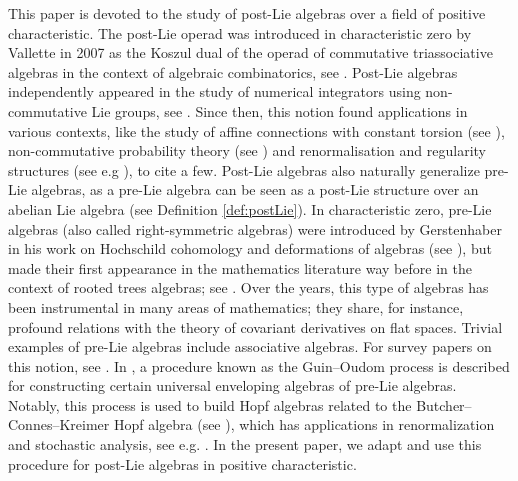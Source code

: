\documentclass[12pt]{article}
\begin{document}
This paper is devoted to the study of post-Lie algebras over a field of positive characteristic. The post-Lie operad was introduced in characteristic zero by Vallette in 2007 as the Koszul dual of the operad of commutative triassociative algebras in the context of algebraic combinatorics, see \cite{Va}. Post-Lie algebras independently appeared in the study of numerical integrators using non-commutative Lie groups, see \cite{MKW}. Since then, this notion found applications in various contexts, like the study of affine connections with constant torsion (see \cite{MKL}), non-commutative probability theory (see \cite{G}) and renormalisation and regularity structures (see e.g \cite{BK}), to cite a few. Post-Lie algebras also naturally generalize pre-Lie algebras, as a pre-Lie algebra can be seen as a post-Lie structure over an abelian Lie algebra (see Definition \ref{def:postLie}). In characteristic zero, pre-Lie algebras (also called right-symmetric algebras) were introduced by Gerstenhaber in his work on Hochschild cohomology and deformations of algebras (see \cite{Ge}), but made their first appearance in the mathematics literature way before in the context of rooted trees algebras; see \cite{C}. Over the years, this type of algebras has been instrumental in many areas of mathematics; they share, for instance, profound relations with the theory of covariant derivatives on flat spaces. Trivial examples of pre-Lie algebras include associative algebras. For survey papers on this notion, see \cite{Bu,M}. In \cite{OG}, a procedure known as the Guin–Oudom process is described for constructing certain universal enveloping algebras of pre-Lie algebras. Notably, this process is used to build Hopf algebras related to the Butcher–Connes–Kreimer Hopf algebra (see \cite{CK}), which has applications in renormalization and stochastic analysis, see e.g. \cite{BK,F}. In the present paper, we adapt and use this procedure for post-Lie algebras in positive characteristic.
\end{document}
